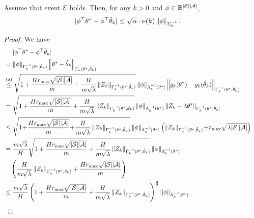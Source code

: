 \begin{lemma} \label{lemma:confence_interval_proj_free}
	Assume that event $\mathcal{E}$ holds. Then, for any $k>0$ and $\phi \in \mathbb{R}^{|\mathcal{S}| |\mathcal{A}|}$,
	\begin{align*}
		|\phi^\top \theta^* - \phi^\top \hat{\theta}_k| \leq \sqrt{\alpha} \cdot \nu(k) \left\| \phi \right\|_{\Sigma_k^{-1}}  .
	\end{align*}
\end{lemma}
\begin{proof}
	We have
	\begin{align*}
		&\quad\ |\phi^\top \theta^* - \phi^\top \hat{\theta}_k| 
		\\
		&= 	\nbr{\phi}_{\Gamma_k^{-1}(\theta^*,\hat{\theta}_k)} \nbr{\theta^* - \hat{\theta}_k}_{\Gamma_k(\theta^*,\hat{\theta}_k)}
		\nonumber\\
		&\overset{\textup{(a)}}{\leq} \sqrt{ 1+  \frac{H r_{\max} \sqrt{|\cS| |\cA|}}{m}   + \frac{H}{m\sqrt{\lambda}} \nbr{ Z_k }_{\Gamma_k^{-1}(\theta^*,\hat{\theta}_k)} } \nbr{\phi}_{\Lambda_k^{-1}(\theta^*)} \nbr{g_k(\theta^*) - g_k(\hat{\theta}_k)}_{\Gamma_k^{-1}(\theta^*,\hat{\theta}_k)}
		\nonumber\\
		&= \sqrt{ 1+  \frac{H r_{\max} \sqrt{|\cS| |\cA|}}{m}   + \frac{H}{m\sqrt{\lambda}} \nbr{ Z_k }_{\Gamma_k^{-1}(\theta^*,\hat{\theta}_k)} } \nbr{\phi}_{\Lambda_k^{-1}(\theta^*)} \nbr{ Z_k-\lambda \theta^* }_{\Gamma_k^{-1}(\theta^*,\hat{\theta}_k)}
		\nonumber\\
		&\leq \sqrt{ 1 \!+\!  \frac{H r_{\max} \sqrt{|\cS| |\cA|}}{m} \!+\! \frac{H}{m\sqrt{\lambda}} \nbr{ Z_k }_{\Gamma_k^{-1}(\theta^*,\hat{\theta}_k)} } \nbr{\phi}_{\Lambda_k^{-1}(\theta^*)} \sbr{\nbr{ Z_k }_{\Gamma_k^{-1}(\theta^*,\hat{\theta}_k)} \!+\! r_{\max} \sqrt{\lambda |\cS| |\cA|}  }
		\nonumber\\
		&= \frac{m \sqrt{\lambda}}{H} \sqrt{ 1+  \frac{H r_{\max} \sqrt{|\cS| |\cA|}}{m}   + \frac{H}{m\sqrt{\lambda}} \nbr{ Z_k }_{\Gamma_k^{-1}(\theta^*,\hat{\theta}_k)} } \nbr{\phi}_{\Lambda_k^{-1}(\theta^*)} \cdot 
		\\
		&\quad \sbr{ \frac{H}{m \sqrt{\lambda}} \nbr{ Z_k }_{\Gamma_k^{-1}(\theta^*,\hat{\theta}_k)} + \frac{Hr_{\max}\sqrt{|\cS| |\cA|} }{m } } 
		\nonumber\\
		&\leq \frac{m \sqrt{\lambda}}{H} \sbr{ 1+  \frac{H r_{\max} \sqrt{|\cS| |\cA|}}{m}   + \frac{H}{m\sqrt{\lambda}} \nbr{ Z_k }_{\Gamma_k^{-1}(\theta^*,\hat{\theta}_k)} }^{\frac{3}{2}} \nbr{\phi}_{\Lambda_k^{-1}(\theta^*)}  
		\nonumber\\

\end{align*}
\end{proof}
